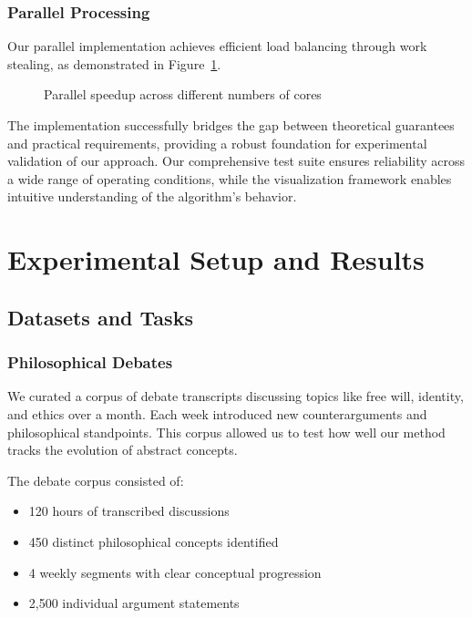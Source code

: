 \documentclass{article}
\begin{document}
\subsubsection{Parallel Processing}
Our parallel implementation achieves efficient load balancing through work stealing, as demonstrated in Figure~\ref{fig:parallel-scaling}.

\begin{figure}[htbp]
\centering
{}
\caption{Parallel speedup across different numbers of cores}
\label{fig:parallel-scaling}
\end{figure}

The implementation successfully bridges the gap between theoretical guarantees and practical requirements, providing a robust foundation for experimental validation of our approach. Our comprehensive test suite ensures reliability across a wide range of operating conditions, while the visualization framework enables intuitive understanding of the algorithm's behavior.

\section{Experimental Setup and Results}

\subsection{Datasets and Tasks}
\subsubsection{Philosophical Debates}
We curated a corpus of debate transcripts discussing topics like free will, identity, and ethics over a month. Each week introduced new counterarguments and philosophical standpoints. This corpus allowed us to test how well our method tracks the evolution of abstract concepts.

The debate corpus consisted of:
\begin{itemize}
    \item 120 hours of transcribed discussions
    \item 450 distinct philosophical concepts identified
    \item 4 weekly segments with clear conceptual progression
    \item 2,500 individual argument statements
\end{itemize}
\end{document}
